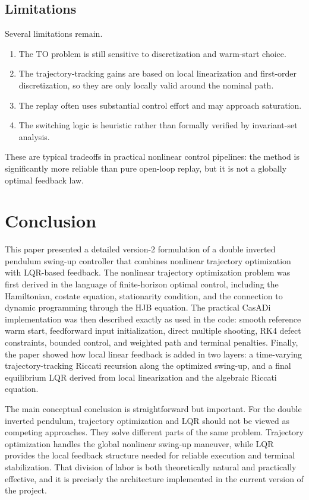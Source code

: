 \documentclass[conference]{IEEEtran}
\begin{document}
\subsection{Limitations}
Several limitations remain.
\begin{enumerate}
\item The TO problem is still sensitive to discretization and warm-start choice.
\item The trajectory-tracking gains are based on local linearization and first-order discretization, so they are only locally valid around the nominal path.
\item The replay often uses substantial control effort and may approach saturation.
\item The switching logic is heuristic rather than formally verified by invariant-set analysis.
\end{enumerate}
These are typical tradeoffs in practical nonlinear control pipelines: the method is significantly more reliable than pure open-loop replay, but it is not a globally optimal feedback law.

\section{Conclusion}
This paper presented a detailed version-2 formulation of a double inverted pendulum swing-up controller that combines nonlinear trajectory optimization with LQR-based feedback. The nonlinear trajectory optimization problem was first derived in the language of finite-horizon optimal control, including the Hamiltonian, costate equation, stationarity condition, and the connection to dynamic programming through the HJB equation. The practical CasADi implementation was then described exactly as used in the code: smooth reference warm start, feedforward input initialization, direct multiple shooting, RK4 defect constraints, bounded control, and weighted path and terminal penalties. Finally, the paper showed how local linear feedback is added in two layers: a time-varying trajectory-tracking Riccati recursion along the optimized swing-up, and a final equilibrium LQR derived from local linearization and the algebraic Riccati equation.

The main conceptual conclusion is straightforward but important. For the double inverted pendulum, trajectory optimization and LQR should not be viewed as competing approaches. They solve different parts of the same problem. Trajectory optimization handles the global nonlinear swing-up maneuver, while LQR provides the local feedback structure needed for reliable execution and terminal stabilization. That division of labor is both theoretically natural and practically effective, and it is precisely the architecture implemented in the current version of the project.
\end{document}

